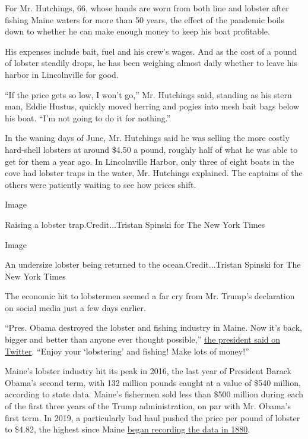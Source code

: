 For Mr. Hutchings, 66, whose hands are worn from both line and lobster
after fishing Maine waters for more than 50 years, the effect of the
pandemic boils down to whether he can make enough money to keep his boat
profitable.

His expenses include bait, fuel and his crew's wages. And as the cost of
a pound of lobster steadily drops, he has been weighing almost daily
whether to leave his harbor in Lincolnville for good.

``If the price gets so low, I won't go,'' Mr. Hutchings said, standing
as his stern man, Eddie Hustus, quickly moved herring and pogies into
mesh bait bags below his boat. ``I'm not going to do it for nothing.''

In the waning days of June, Mr. Hutchings said he was selling the more
costly hard-shell lobsters at around \$4.50 a pound, roughly half of
what he was able to get for them a year ago. In Lincolnville Harbor,
only three of eight boats in the cove had lobster traps in the water,
Mr. Hutchings explained. The captains of the others were patiently
waiting to see how prices shift.

Image

Raising a lobster trap.Credit...Tristan Spinski for The New York Times

Image

An undersize lobster being returned to the ocean.Credit...Tristan
Spinski for The New York Times

The economic hit to lobstermen seemed a far cry from Mr. Trump's
declaration on social media just a few days earlier.

``Pres. Obama destroyed the lobster and fishing industry in Maine. Now
it's back, bigger and better than anyone ever thought possible,''
\href{https://twitter.com/realDonaldTrump/status/1275951862269829121}{the
president said on Twitter}. ``Enjoy your `lobstering' and fishing! Make
lots of money!''

Maine's lobster industry hit its peak in 2016, the last year of
President Barack Obama's second term, with 132 million pounds caught at
a value of \$540 million, according to state data. Maine's fishermen
sold less than \$500 million during each of the first three years of the
Trump administration, on par with Mr. Obama's first term. In 2019, a
particularly bad haul pushed the price per pound of lobster to \$4.82,
the highest since Maine
\href{https://www.maine.gov/dmr/commercial-fishing/landings/documents/lobster.table.pdf}{began
recording the data in 1880}.

